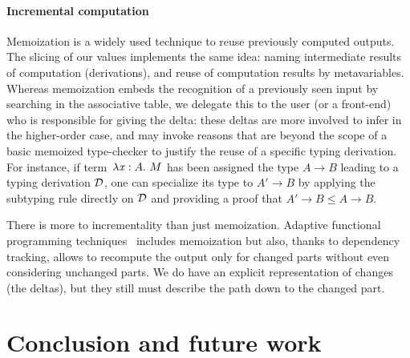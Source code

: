 \documentclass{llncs}
\begin{document}

\paragraph{Incremental computation}

Memoization is a widely used technique to reuse previously computed
outputs. The slicing of our values implements the same idea: naming
intermediate results of computation (derivations), and reuse of
computation results by metavariables. Whereas memoization embeds the
recognition of a previously seen input by searching in the associative
table, we delegate this to the user (or a front-end) who is
responsible for giving the delta: these deltas are more involved to
infer in the higher-order case, and may invoke reasons that are
beyond the scope of a basic memoized type-checker to justify the reuse
of a specific typing derivation. For instance, if term~$\lambda{\ensuremath{\text{\textit{x}}}}:{A}.\  M$
has been assigned the type $A \rightarrow B$ leading to a typing
derivation $\mathcal D$, one can specialize its type to $A'\rightarrow B$ by
applying the subtyping rule directly on $\mathcal D$ and providing a proof
that $A' \rightarrow B \leq A \rightarrow B$.

There is more to incrementality than just memoization. Adaptive
functional programming techniques~\cite{acar2006,carlsson2002}
includes memoization but also, thanks to dependency tracking, allows
to recompute the output only for changed parts without even
considering unchanged parts. We do have an explicit representation of
changes (the deltas), but they still must describe the path down to
the changed part.

\section*{Conclusion and future work}
\end{document}
